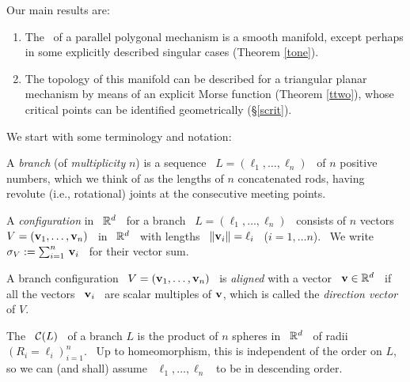 Our main results are\vsm :

\begin{enumerate}
\renewcommand{\labelenumi}{(\alph{enumi})}
%
\item The \cspace\ of a parallel polygonal mechanism is a smooth
  manifold, except perhaps in some explicitly described  singular
  cases (Theorem \ref{tone}).
%
\item The topology of this manifold can be described for a triangular
  planar mechanism by means of an explicit Morse function (Theorem \ref{ttwo}),
  whose critical points can be identified geometrically (\S \ref{scrit})\vs.
%
\end{enumerate}

We start with some terminology and notation:

\begin{defn}\label{dbranch}
%
A \emph{branch} (of \emph{multiplicity} $n$) is a sequence \
$L=(\ell_{1},\dotsc,\ell_{n})$ \ of $n$ positive numbers, which we
think of as the lengths of $n$ concatenated rods, having revolute
(i.e., rotational) joints at the consecutive meeting points.
%
\end{defn}

\begin{defn}\label{dbconfiguration}
%
A \emph{configuration} in \ ${\mathbb R}^{d}$ \ for a branch \
$L=(\ell_{1},\dotsc,\ell_{n})$ \ consists of $n$ vectors \
$V=(\mathbf{v}_{1},\dotsc,\mathbf{v}_{n})$ \ in \ ${\mathbb R}^{d}$ \ with lengths \
$\|\mathbf{v}_{i}\|=\ell_{i}$ \ ($i=1,\dotsc n$). \ We write \
$\sigma_{V}:=\sum_{i=1}^{n}\,\mathbf{v}_{i}$ \ for their vector sum.

A branch configuration \ $V=(\mathbf{v}_{1},\dotsc,\mathbf{v}_{n})$ \ is
\emph{aligned} with a vector \ $\mathbf{v}\in{\mathbb R}^{d}$ \ if all the vectors
\ $\mathbf{v}_{i}$ \ are scalar multiples of $\mathbf{v}$, which is called the
\emph{direction vector} of $V$. \newnot{3-3}
%
\end{defn}

The \emph{\cspace} \ $\mathcal{C}(L)$ \ of a branch $L$ is the product of $n$
spheres in \ ${\mathbb R}^{d}$ \ of radii \ $(R_{i}=\ell_{i})_{i=1}^{n}$. \
Up to homeomorphism, this is independent of the order on $L$, so we can (and
shall) assume \ $\ell_{1},\dotsc,\ell_{n}$ \ to be in descending order.

